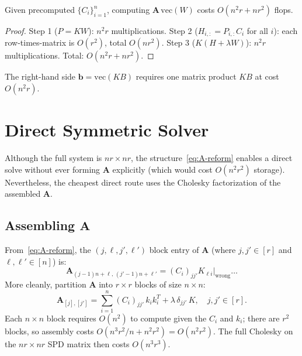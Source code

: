 \documentclass[12pt]{article}
\theoremstyle{definition}
\begin{document}
\begin{proposition}
Given precomputed $\{C_i\}_{i=1}^n$, computing $\mathbf{A}\,\mathrm{vec}(W)$ costs $O(n^2 r + nr^2)$ flops.
\end{proposition}
\begin{proof}
Step 1 ($P = KW$): $n^2 r$ multiplications. Step 2 ($H_{i,:} = P_{i,:}C_i$ for all $i$): each row-times-matrix is $O(r^2)$, total $O(nr^2)$. Step 3 ($K(H+\lambda W)$): $n^2 r$ multiplications. Total: $O(n^2r + nr^2)$.
\end{proof}

The right-hand side $\mathbf{b} = \mathrm{vec}(KB)$ requires one matrix product $KB$ at cost $O(n^2 r)$.

\section{Direct Symmetric Solver}\label{sec:direct}

Although the full system is $nr \times nr$, the structure~\eqref{eq:A-reform} enables a direct solve without ever forming $\mathbf{A}$ explicitly (which would cost $O(n^2r^2)$ storage). Nevertheless, the cheapest direct route uses the Cholesky factorization of the assembled $\mathbf{A}$.

\subsection{Assembling $\mathbf{A}$}

From~\eqref{eq:A-reform}, the $(j,\ell,j',\ell')$ block entry of $\mathbf{A}$ (where $j,j'\in[r]$ and $\ell,\ell'\in[n]$) is:
\[
\mathbf{A}_{(j-1)n+\ell,\,(j'-1)n+\ell'} = (C_i)_{jj'} K_{\ell i}\big|_{\text{wrong}} \ldots
\]
More cleanly, partition $\mathbf{A}$ into $r \times r$ blocks of size $n \times n$:
\[
\mathbf{A}_{[j],[j']} = \sum_{i=1}^n (C_i)_{jj'}\,k_i k_i^T + \lambda\,\delta_{jj'}\,K, \quad j,j'\in[r].
\]
Each $n\times n$ block requires $O(n^2)$ to compute given the $C_i$ and $k_i$; there are $r^2$ blocks, so assembly costs $O(n^3 r^2 / n + n^2 r^2) = O(n^2 r^2)$. The full Cholesky on the $nr\times nr$ SPD matrix then costs $O(n^3r^3)$.

\medskip
\end{document}
